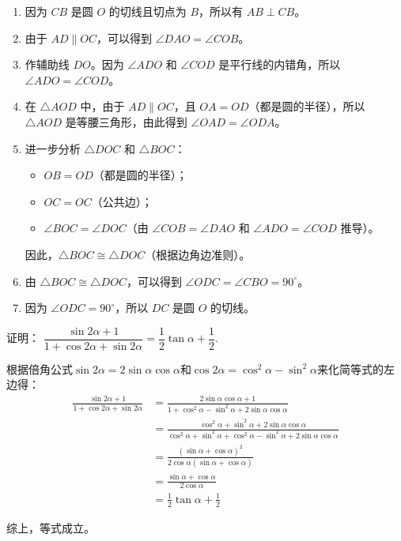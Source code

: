 \documentclass[answers]{exam}
\begin{document}
\begin{questions}
	\begin{solution}
		\begin{enumerate}[label=\arabic*.]
			\item 因为 $CB$ 是圆 $O$ 的切线且切点为 $B$，所以有 $AB \perp CB$。
			\item 由于 $AD \parallel OC$，可以得到 $\angle DAO = \angle COB$。
			\item 作辅助线 $DO$。因为 $\angle ADO$ 和 $\angle COD$ 是平行线的内错角，所以 $\angle ADO = \angle COD$。
			\item 在 $\triangle AOD$ 中，由于 $AD \parallel OC$，且 $OA = OD$（都是圆的半径），所以 $\triangle AOD$ 是等腰三角形，由此得到 $\angle OAD = \angle ODA$。
			\item 进一步分析 $\triangle DOC$ 和 $\triangle BOC$：
			      \begin{itemize}
				      \item $OB = OD$（都是圆的半径）；
				      \item $OC = OC$（公共边）；
				      \item $\angle BOC = \angle DOC$（由 $\angle COB = \angle DAO$ 和 $\angle ADO = \angle COD$ 推导）。
			      \end{itemize}
			      因此，$\triangle BOC \cong \triangle DOC$（根据边角边准则）。
			\item 由 $\triangle BOC \cong \triangle DOC$，可以得到 $\angle ODC = \angle CBO = 90^\circ$。
			\item 因为 $\angle ODC = 90^\circ$，所以 $DC$ 是圆 $O$ 的切线。
		\end{enumerate}
	\end{solution}

	\question 证明： $\dfrac{\sin2\alpha + 1}{1+\cos2\alpha + \sin2\alpha} = \dfrac12\tan\alpha + \dfrac12$.
	\begin{mathenum}
		\item 根据倍角公式$\sin2\alpha = 2\sin\alpha\cos\alpha$和$\cos2\alpha=\cos^2\alpha -
			\sin^2\alpha$来化简等式的左边得：
		\begin{align*}
			\frac{\sin2\alpha + 1}{1+\cos2\alpha + \sin2\alpha}
			 & = \frac{2\sin\alpha\cos\alpha + 1}{1 + \cos^2\alpha - \sin^2\alpha + 2\sin\alpha\cos\alpha} \\
			 & = \frac{\cos^2\alpha + \sin^2\alpha + 2\sin\alpha\cos\alpha}{\cos^2\alpha + \sin^2\alpha +
			\cos^2\alpha - \sin^2\alpha + 2\sin\alpha\cos\alpha}                                           \\
			 & = \frac{(\sin\alpha + \cos\alpha)^2}{2\cos\alpha(\sin\alpha + \cos\alpha)}                  \\
			 & = \frac{\sin\alpha + \cos\alpha}{2\cos\alpha}                                               \\
			 & = \frac12\tan\alpha + \frac12
		\end{align*}
		\item 综上，等式成立。
	\end{mathenum}


\end{questions}
\end{document}
